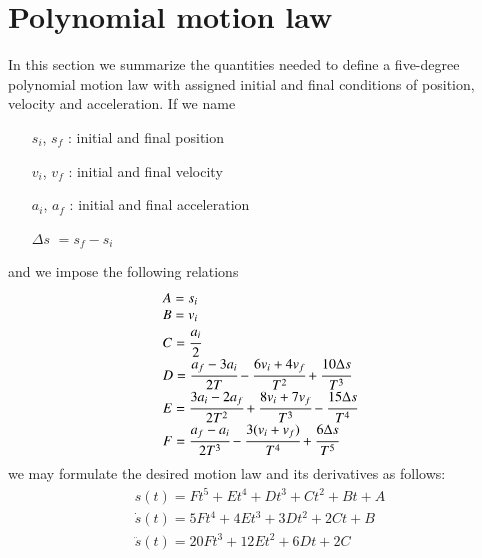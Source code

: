 \section{Polynomial motion law}
\label{app:poly5}
In this section we summarize the quantities needed to define a five-degree polynomial motion law with assigned initial and final conditions of position, velocity and acceleration. If we name
\begin{itemize}
    \item[$s_i$, $s_f$]: initial and final position
    \item[$v_i$, $v_f$]: initial and final velocity
    \item[$a_i$, $a_f$]: initial and final acceleration
    \item[$\Delta s$]$= s_f - s_i$
\end{itemize}
and we impose the following relations
\begin{equation}
    \begin{array}{l}
        A = s_i\\
        B = v_i\\
        C = \cfrac{a_i}{2}\\
        D = \cfrac{a_f - 3a_i}{2T} - \cfrac{6v_i + 4v_f}{T^2} + \cfrac{10 \Delta s}{T^3}\\
        E = \cfrac{3a_i - 2a_f}{2T^2} + \cfrac{8v_i + 7v_f}{T^3} - \cfrac{15 \Delta s}{T^4}\\
        F = \cfrac{a_f - a_i}{2T^3} - \cfrac{3(v_i + v_f)}{T^4} + \cfrac{6 \Delta s}{T^5}\\
    \end{array}
\end{equation}
we may formulate the desired motion law and its derivatives as follows:
\begin{equation}
    \begin{array}{l}
        s(t) = Ft^5 + Et^4 + Dt^3 + Ct^2 + Bt + A\\
        \dot{s}(t) = 5Ft^4 + 4Et^3 + 3Dt^2 + 2Ct + B\\
        \ddot{s}(t) = 20Ft^3 + 12Et^2 + 6Dt + 2C\\
    \end{array}
    \label{eq:poly5}
\end{equation}